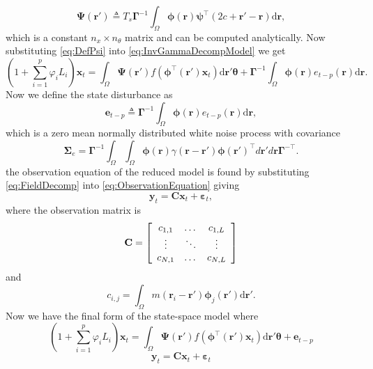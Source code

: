 \documentclass[11pt,draftcls,onecolumn,peerreview]{IEEEtran}
\begin{document}
\begin{equation}\label{eq:DefPsi}
	\boldsymbol{\Psi}(\mathbf{r}') \triangleq T_s\boldsymbol{\Gamma}^{-1}\int_\Omega {\boldsymbol{\phi}(\mathbf{r})\boldsymbol{\psi}^{\top} (2c+\mathbf{r}'-\mathbf{r})\textrm{d}\mathbf{r}},
\end{equation}
which is a constant $n_x \times n_{\theta}$ matrix and can be computed analytically. Now substituting \eqref{eq:DefPsi} into \eqref{eq:InvGammaDecompModel} we get
\begin{equation}
(1+\sum_{i=1}^{p}\varphi_i L_i) \mathbf{x}_t = \int_\Omega \boldsymbol{\Psi}(\mathbf{r}') f(\boldsymbol{\phi}^{\top}(\mathbf{r}')\mathbf{x}_t) \textrm{d}\mathbf{r}' \boldsymbol{\theta}
+ \boldsymbol{\Gamma}^{-1} \int_\Omega{\boldsymbol{\phi}(\mathbf{r})e_{t-p}(\mathbf{r})\textrm{d}\mathbf{r}}.
\end{equation}
Now we define the state disturbance as
\begin{equation}\label{eq:Wt} 
	\mathbf{e}_{t-p} \triangleq \boldsymbol{\Gamma}^{-1}\int_\Omega {\boldsymbol{\phi} ( \mathbf{r} )e_{t-p}( \mathbf{r} )\textrm{d}\mathbf{r}},
\end{equation}
which is a zero mean normally distributed white noise process with covariance
\begin{equation}
	\boldsymbol\Sigma_e =\mathbf{\Gamma}^{-1}\int_{\Omega}\int_{\Omega}\boldsymbol{\phi}\left(\mathbf r\right) \gamma\left(\mathbf r- \mathbf r' \right)\boldsymbol{\phi}\left(\mathbf r'\right)^{\top}d\mathbf r' d\mathbf r\mathbf{\Gamma}^{- \top}. 
\end{equation}
the observation equation of the reduced model is found by substituting \eqref{eq:FieldDecomp} into \eqref{eq:ObservationEquation} giving
\begin{equation}\label{ObservationEquation} 
	\mathbf{y}_t = \mathbf{C}\mathbf{x}_t + \boldsymbol{\varepsilon}_t,
\end{equation}
where the observation matrix is 
\begin{equation}
	\mathbf{C} = \left[
	\begin{array}{{ccc}} 
		c_{1,1} & \dots & c_{1,L} \\
		\vdots & \ddots & \vdots \\
		c_{N,1} & \dots & c_{N,L} 
	\end{array}
	\right] 
\end{equation}
and 
\begin{equation}
	c_{i,j} = \int_{\Omega}m(\mathbf{r}_i - \mathbf{r}')\boldsymbol{\phi}_j(\mathbf{r}')\textrm{d}\mathbf{r}'. 
\end{equation}
Now we have the final form of the state-space model where
\begin{equation}\label{eq:finalformstatespacemodel}
	(1+\sum_{i=1}^{p}\varphi_i L_i) \mathbf{x}_t = \int_\Omega \boldsymbol{\Psi}(\mathbf{r}') f(\boldsymbol{\phi}^{\top}(\mathbf{r}')\mathbf{x}_t) \textrm{d}\mathbf{r}' \boldsymbol{\theta}
 +\mathbf{e}_{t-p}
\end{equation}
\begin{equation} 
	\mathbf{y}_t = \mathbf{C}\mathbf{x}_t + \boldsymbol{\varepsilon}_t
\end{equation}
\end{document}
